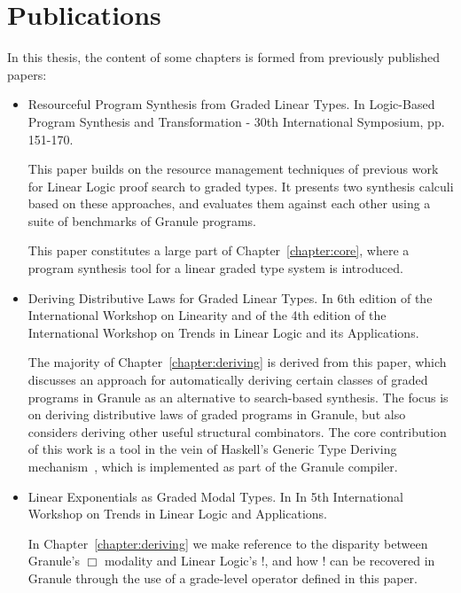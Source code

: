 \section{Publications}
In this thesis, the content of some chapters is formed from
previously published papers:
\begin{itemize}
    \item \citet{DBLP:conf/lopstr/HughesO20} Resourceful Program Synthesis from
    Graded Linear Types. In Logic-Based Program Synthesis and Transformation -
    30th International Symposium, pp. 151-170. 
    
    This paper builds on the resource management techniques of previous work for
    Linear Logic proof search to graded types. It presents two synthesis
    calculi based on these approaches, and evaluates them against each other 
    using a suite of benchmarks of Granule programs. 
    
    This paper constitutes a large part of Chapter~\ref{chapter:core}, where a
    program synthesis tool for a linear graded type system is introduced. 

    \item \citet{DBLP:journals/corr/abs-2112-14966} Deriving Distributive Laws
    for Graded Linear Types. In 6th edition of the International Workshop on
    Linearity and of the 4th edition of the International Workshop on Trends in
    Linear Logic and its Applications. 

    The majority of Chapter~\ref{chapter:deriving} is derived from this paper,
    which discusses an approach for automatically deriving certain classes of
    graded programs in Granule as an alternative to search-based synthesis. The
    focus is on deriving distributive laws of graded programs in Granule, but
    also considers deriving other useful structural combinators. The core
    contribution of this work is a tool in the vein of Haskell's Generic Type
    Deriving mechanism~\citep{generic-deriving}, which is implemented as part of
    the Granule compiler.

    \item \citet{hughes:lirmm-03271465} Linear Exponentials as Graded Modal
    Types. In In 5th International Workshop on Trends in Linear Logic and
    Applications.  

    In Chapter~\ref{chapter:deriving} we make reference to
    the disparity between Granule's $\Box$ modality and Linear Logic's !, and
    how ! can be recovered in Granule through the use of a grade-level operator
    defined in this paper.  
\end{itemize}
